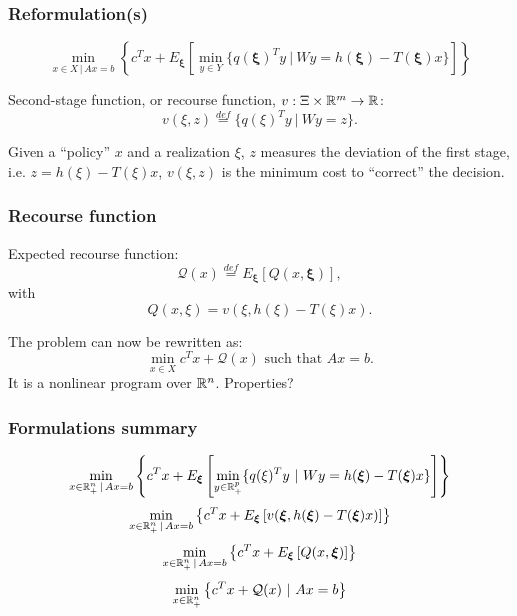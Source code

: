\documentclass{beamer}
\def\bxi{\boldsymbol\xi}
\def\bxi{\boldsymbol\xi}
\begin{document}
\begin{frame}
\frametitle{Reformulation(s)}

\[
\min_{x \in X \,|\, Ax = b} \left\lbrace c^Tx + E_{\bxi} \left[ \min_{y \in Y} \lbrace q(\bxi)^Ty \ |\ Wy = h(\bxi) - T(\bxi)x \rbrace \right] \right\rbrace 
\]

\mbox{}

{\red Second-stage function}, or {\red recourse function}, $v: \Xi \times {\mathbb{R}}^m \rightarrow {\mathbb{R}}$:
\[
v(\xi, z) \overset{def}{=} \lbrace q(\xi)^Ty \ |\ Wy = z \rbrace.
\]

\mbox{}

Given a ``policy'' $x$ and a realization $\xi$, $z$ measures the deviation of the first stage, i.e. $z = h(\xi) - T(\xi)x$, $v(\xi, z)$ is the minimum cost to ``correct'' the decision. %

\end{frame}

\begin{frame}
\frametitle{Recourse function}

{\red Expected recourse function}:
\[
\mathcal{Q}(x) \overset{def}{=} E_{\bxi}[Q(x,\bxi)],
\]
with
\[
Q(x, \xi) = v(\xi, h(\xi)-T(\xi)x).
\]

\mbox{}

The problem can now be rewritten as:
\[
\min_{x \in X} c^Tx + \mathcal{Q}(x) \mbox{ such that } Ax = b.
\]
It is a nonlinear program over ${\mathbb{R}}^n$. Properties?
\end{frame}

\begin{frame}
\frametitle{Formulations summary}

\[
\min_{x \in \RR^n_+ \,|\, Ax = b} \left\lbrace c^Tx + E_{\bxi} \left[ \min_{y \in \RR^p_+} \lbrace q(\xi)^Ty \ |\ Wy = h(\bxi) - T(\bxi)x \rbrace \right] \right\rbrace 
\]
\[
\min_{x \in \RR^n_+ \,|\, Ax = b} \left\lbrace c^Tx + E_{\bxi}
  \left[  v(\bxi, h(\bxi)-T(\bxi)x) \right] \right\rbrace 
\]
\[
\min_{x \in \RR^n_+ \,|\, Ax = b} \left\lbrace c^Tx + E_{\bxi} \left[ Q(x,\bxi) \right] \right\rbrace 
\]
\[
\min_{x \in {\mathbb{R}}^n_+} \left\lbrace c^Tx + \mathcal{Q}(x)
  \ |\ Ax = b \right\rbrace 
\]

\end{frame}
\end{document}

